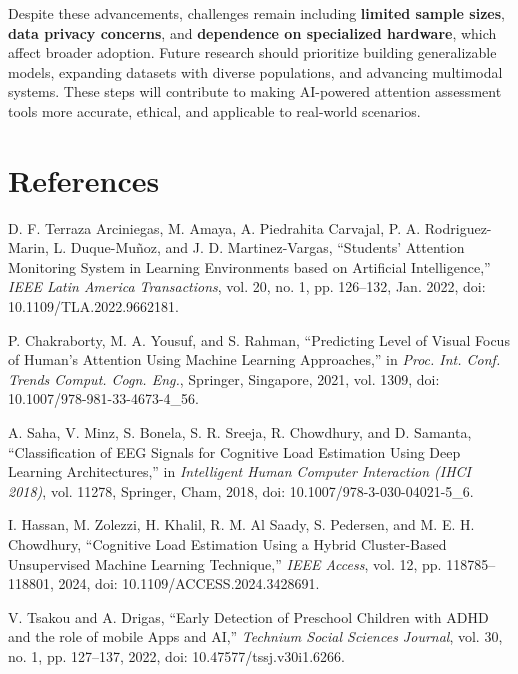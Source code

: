 \documentclass[twocolumn,12pt]{article}
\begin{document}
{Despite these advancements, challenges remain including \textbf{limited sample sizes}, \textbf{data privacy concerns}, and \textbf{dependence on specialized hardware}, which affect broader adoption. Future research should prioritize building generalizable models, expanding datasets with diverse populations, and advancing multimodal systems. These steps will contribute to making AI-powered attention assessment tools more accurate, ethical, and applicable to real-world scenarios.

\vspace{1em}

\section*{References}
\begingroup
\setlength{\parskip}{0.4em}
\setlength{\itemsep}{0pt}
\renewcommand{\section}[2]{}%
\begin{thebibliography}{99}

 D. F. Terraza Arciniegas, M. Amaya, A. Piedrahita Carvajal, P. A. Rodriguez-Marin, L. Duque-Muñoz, and J. D. Martinez-Vargas, “Students’ Attention Monitoring System in Learning Environments based on Artificial Intelligence,” \textit{IEEE Latin America Transactions}, vol. 20, no. 1, pp. 126–132, Jan. 2022, doi: 10.1109/TLA.2022.9662181.

 P. Chakraborty, M. A. Yousuf, and S. Rahman, “Predicting Level of Visual Focus of Human’s Attention Using Machine Learning Approaches,” in \textit{Proc. Int. Conf. Trends Comput. Cogn. Eng.}, Springer, Singapore, 2021, vol. 1309, doi: 10.1007/978-981-33-4673-4\_56.

 A. Saha, V. Minz, S. Bonela, S. R. Sreeja, R. Chowdhury, and D. Samanta, “Classification of EEG Signals for Cognitive Load Estimation Using Deep Learning Architectures,” in \textit{Intelligent Human Computer Interaction (IHCI 2018)}, vol. 11278, Springer, Cham, 2018, doi: 10.1007/978-3-030-04021-5\_6.

 I. Hassan, M. Zolezzi, H. Khalil, R. M. Al Saady, S. Pedersen, and M. E. H. Chowdhury, “Cognitive Load Estimation Using a Hybrid Cluster-Based Unsupervised Machine Learning Technique,” \textit{IEEE Access}, vol. 12, pp. 118785–118801, 2024, doi: 10.1109/ACCESS.2024.3428691.

 V. Tsakou and A. Drigas, “Early Detection of Preschool Children with ADHD and the role of mobile Apps and AI,” \textit{Technium Social Sciences Journal}, vol. 30, no. 1, pp. 127–137, 2022, doi: 10.47577/tssj.v30i1.6266.


\end{thebibliography}}
\end{document}
